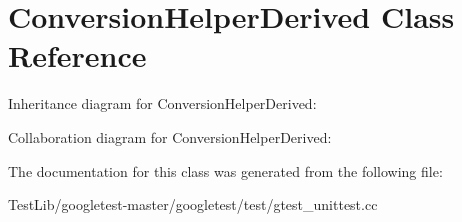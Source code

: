 \hypertarget{classConversionHelperDerived}{}\section{Conversion\+Helper\+Derived Class Reference}
\label{classConversionHelperDerived}


Inheritance diagram for Conversion\+Helper\+Derived\+:


Collaboration diagram for Conversion\+Helper\+Derived\+:


The documentation for this class was generated from the following file\+:\begin{DoxyCompactItemize}
\item 
Test\+Lib/googletest-\/master/googletest/test/gtest\+\_\+unittest.\+cc\end{DoxyCompactItemize}
